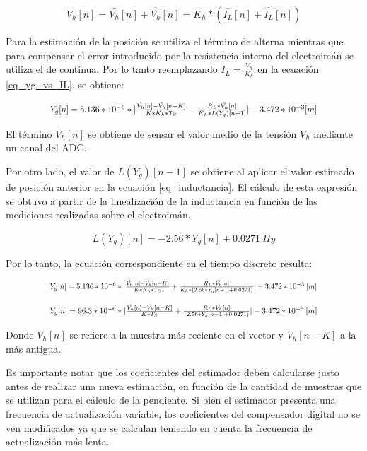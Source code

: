 \begin{equation} 
	V_h[n] = \bar{V_h}[n] + \hat{V_h}[n] = K_h * (\bar{I_L}[n] + \hat{I_L}[n])
\end{equation}

 Para la estimación de la posición se utiliza el término de alterna mientras que para compensar el error introducido por la resistencia interna del electroimán se utiliza el de continua. Por lo tanto reemplazando $I_L=\frac{V_h}{K_h}$ en la ecuación \ref{eq_yg_vs_IL}, se obtiene:

\begin{equation}
	\resizebox{.8\hsize}{!}
	{
	$Y_g[n] = 5.136*10^{-6}*|\frac{\hat{V_h}[n]-\hat{V_h}[n-K]}{K*K_h*T_S} + \frac{R_L*\bar{V_h}[n]}{K_h*L(Y_g)[n-1]}|-3.472*10^{-3}[m]$
	}
\end{equation}

El término $\bar{V_h}[n]$ se obtiene de sensar el valor medio de la tensión $V_h$ mediante un canal del ADC.

Por otro lado, el valor de $L(Y_g)[n-1]$ se obtiene al aplicar el valor estimado de posición anterior en la ecuación \ref{eq_inductancia}. El cálculo de esta expresión se obtuvo a partir de la linealización de la inductancia en función de las mediciones realizadas sobre el electroimán.


\begin{equation} \label{eq_inductancia}
	L(Y_g)[n] = -2.56*Y_g[n]+0.0271\:Hy
\end{equation}

 Por lo tanto, la ecuación correspondiente en el tiempo discreto resulta:

\begin{equation}
	\resizebox{.8\hsize}{!}
	{
	$Y_g[n] = 5.136*10^{-6}*|\frac{\hat{V_h}[n]-\hat{V_h}[n-K]}{K*K_h*T_S} + \frac{R_L*\bar{V_h}[n]}{K_h*(2.56*Y_g[n-1]+0.0271)}|-3.472*10^{-3}\:[m]$
	}
\end{equation}

\begin{equation}
	\resizebox{.8\hsize}{!}
	{
	$
	Y_g[n] = 96.3*10^{-6}*|\frac{\hat{V_h}[n]-\hat{V_h}[n-K]}{K*T_S} + \frac{R_L*\bar{V_h}[n]}{(2.56*Y_g[n-1]+0.0271)}|-3.472*10^{-3}\:[m]
	$
	}
\end{equation}


Donde $V_h[n]$ se refiere a la muestra más reciente en el vector y $V_h[n-K]$ a la más antigua.

Es importante notar que los coeficientes del estimador deben calcularse justo antes de realizar una nueva estimación,  en función de la cantidad de muestras que se utilizan para el cálculo de la pendiente. Si bien el estimador presenta una frecuencia de actualización variable, los coeficientes del compensador digital no se ven modificados ya que se calculan teniendo en cuenta la frecuencia de actualización más lenta.


